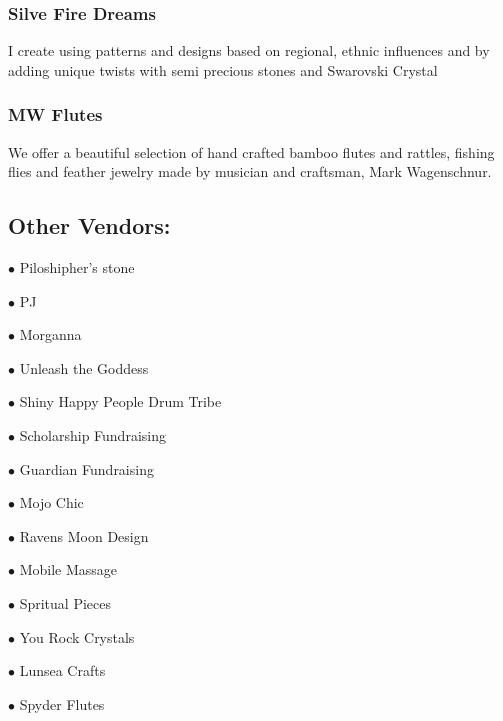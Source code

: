 \subsubsection{Silve Fire Dreams} { \small I create using patterns and designs based on regional, ethnic influences and by adding unique twists with semi precious stones and Swarovski Crystal } 

\subsubsection{MW Flutes} { \small We offer a beautiful selection of hand crafted bamboo flutes and rattles, fishing flies and feather jewelry made by musician and craftsman, Mark Wagenschnur. } 

 \subsection{Other Vendors:} 

\indent 


 $ \bullet $ Piloshipher's stone 


 $ \bullet $ PJ 


 $ \bullet $ Morganna 


 $ \bullet $ Unleash the Goddess 


 $ \bullet $ Shiny Happy People Drum Tribe 


 $ \bullet $ Scholarship Fundraising 


 $ \bullet $ Guardian Fundraising 


 $ \bullet $ Mojo Chic 


 $ \bullet $ Ravens Moon Design 


 $ \bullet $ Mobile Massage 


 $ \bullet $ Spritual Pieces 


 $ \bullet $ You Rock Crystals 


 $ \bullet $ Lunsea Crafts 


 $ \bullet $ Spyder Flutes 

